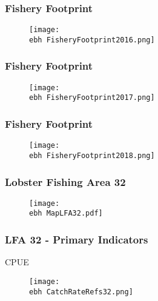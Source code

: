 \documentclass{beamer}
\newcommand{\ebh}{\string~/bio.data/bio.lobster/figures/Assessment/LFA2732/} %
\begin{document}
\begin{frame}
\frametitle{Fishery Footprint}
\begin{figure}
        \begin{center}
            \texttt{[image: \\ebh FisheryFootprint2016.png]}
        \end{center}
    \end{figure}
\end{frame}




\begin{frame}
\frametitle{Fishery Footprint}
\begin{figure}
        \begin{center}
            \texttt{[image: \\ebh FisheryFootprint2017.png]}
        \end{center}
    \end{figure}
\end{frame}




\begin{frame}
\frametitle{Fishery Footprint}
\begin{figure}
        \begin{center}
            \texttt{[image: \\ebh FisheryFootprint2018.png]}
        \end{center}
    \end{figure}
\end{frame}






\begin{frame}
\frametitle{Lobster Fishing Area 32}
\begin{figure}
        \begin{center}
            \texttt{[image: \\ebh MapLFA32.pdf]}
        \end{center}
    \end{figure}
\end{frame}


\begin{frame}
\frametitle{LFA 32 - Primary Indicators}
CPUE
\begin{figure}
        \begin{center}
            \texttt{[image: \\ebh CatchRateRefs32.png]}
        \end{center}
    \end{figure}
\end{frame}
\end{document}
